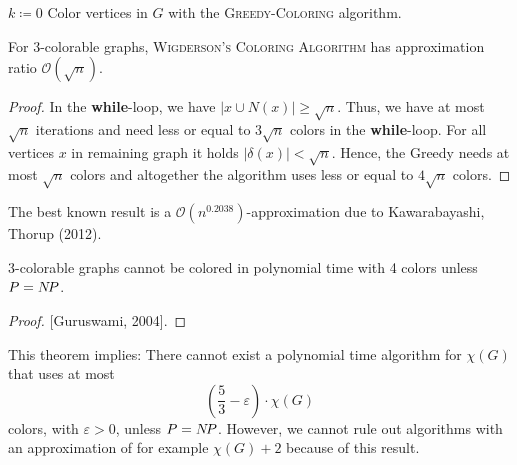 \documentclass[../skript.tex]{subfiles}
\begin{document}
\vspace{-7pt}
\begin{algorithm}[H]
$k \coloneqq 0$\;
Color vertices in $G$ with the \textsc{Greedy-Coloring} algorithm.\;
\end{algorithm}
\vspace{-7pt}
\EndAlgorithmLine
\begin{theorem} %
\label{thm:35}
For 3-colorable graphs, \textsc{Wigderson's Coloring Algorithm} has approximation ratio $\mathcal{O}(\sqrt{n})$.
\end{theorem}
\begin{proof}
In the \textbf{while}-loop, we have $|x \cup N(x)| \geq \sqrt{n}$.
Thus, we have at most $\sqrt{n}$ iterations and need less or equal to $3 \sqrt{n}$ colors in the \textbf{while}-loop.
For all vertices $x$ in remaining graph it holds $|\delta(x)| < \sqrt{n}$.
Hence, the Greedy needs at most $\sqrt{n}$ colors and altogether the algorithm uses less or equal to $4 \sqrt{n}$ colors.
\end{proof}
The best known result is a $\mathcal{O}(n^{0.2038})$-approximation due to Kawarabayashi, Thorup (2012).
\begin{theorem} %
\label{thm:36}
3-colorable graphs cannot be colored in polynomial time with 4 colors unless $P = N \! P$.
\end{theorem}
\begin{proof}

[Guruswami, 2004].
\end{proof}
This theorem implies: There cannot exist a polynomial time algorithm for $\chi(G)$ that uses at most
\[
	\left( \frac{5}{3} - \varepsilon \right) \cdot \chi(G)
\]
colors, with $\varepsilon > 0$, unless $P = N \! P$. However, we cannot rule out algorithms with an approximation of for example $\chi(G) + 2$ because of this result.
\end{document}
